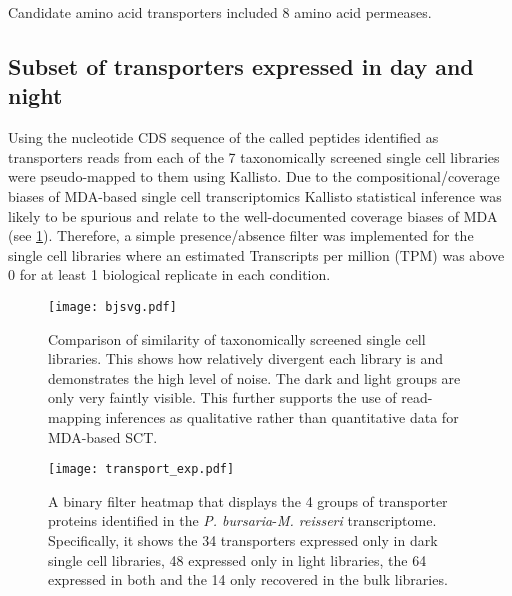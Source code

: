 Candidate amino acid transporters included 8 amino acid
permeases.
%

\subsection{Subset of transporters expressed in day and night}

Using the nucleotide CDS sequence of the called peptides identified as transporters
reads from each of the 7 taxonomically screened single cell libraries were pseudo-mapped
to them using Kallisto. 
Due to the compositional/coverage biases of MDA-based single cell transcriptomics 
Kallisto statistical inference was likely to be spurious and relate to the 
well-documented coverage biases of MDA (see \cref{fig:jsd}). Therefore, a simple presence/absence
filter was implemented for the single cell libraries where an estimated
Transcripts per million (TPM) was above 0 for at least 1 biological replicate
in each condition. 

\begin{figure}
    \centering
    \texttt{[image: bjsvg.pdf]}
    \caption[Jasper-shannon divergence of single cell transcriptome libraries]{Comparison of similarity of 
    taxonomically screened single cell libraries.  This shows how relatively divergent
each library is and demonstrates the high level of noise.  The dark and light groups
are only very faintly visible.  This further supports the use of read-mapping inferences
as qualitative rather than quantitative data for MDA-based SCT.}
\label{fig:jsd}
\end{figure}

 \begin{figure}
     \centering
     \texttt{[image: transport\_exp.pdf]}
     \caption{A binary filter heatmap that displays the 4 groups of transporter
         proteins identified in the \textit{P. bursaria}-\textit{M. reisseri} 
         transcriptome.  Specifically, it shows the 34 transporters expressed only
         in dark single cell libraries, 48 expressed only in light libraries, the 64
         expressed in both and the 14 only recovered in the bulk libraries.}
     \label{fig:binary_expression_heatmap}
 \end{figure}


